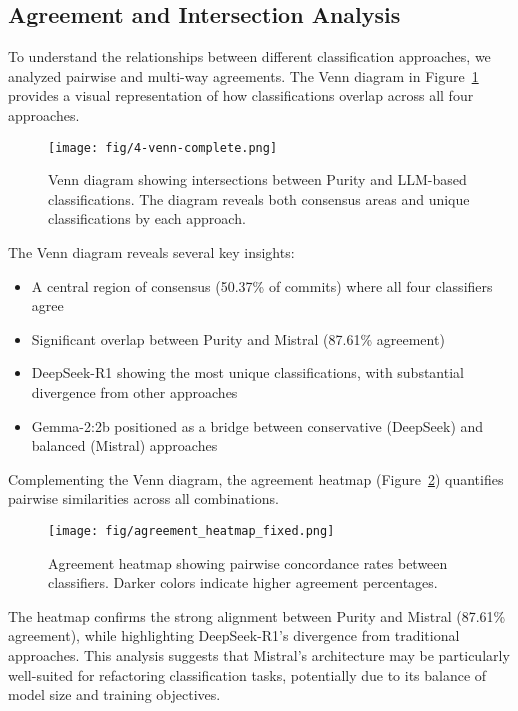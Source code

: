\subsection{Agreement and Intersection Analysis}

To understand the relationships between different classification approaches, we analyzed pairwise and multi-way agreements. The Venn diagram in Figure~\ref{fig:venn} provides a visual representation of how classifications overlap across all four approaches.

\begin{figure}[H]
\centering
\texttt{[image: fig/4-venn-complete.png]}
\caption{Venn diagram showing intersections between Purity and LLM-based classifications. The diagram reveals both consensus areas and unique classifications by each approach.}
\label{fig:venn}
\end{figure}

The Venn diagram reveals several key insights:
\begin{itemize}
    \item A central region of consensus (50.37\% of commits) where all four classifiers agree
    \item Significant overlap between Purity and Mistral (87.61\% agreement)
    \item DeepSeek-R1 showing the most unique classifications, with substantial divergence from other approaches
    \item Gemma-2:2b positioned as a bridge between conservative (DeepSeek) and balanced (Mistral) approaches
\end{itemize}

Complementing the Venn diagram, the agreement heatmap (Figure~\ref{fig:agreement-heatmap}) quantifies pairwise similarities across all combinations.

\begin{figure}[H]
\centering
\texttt{[image: fig/agreement\_heatmap\_fixed.png]}
\caption{Agreement heatmap showing pairwise concordance rates between classifiers. Darker colors indicate higher agreement percentages.}
\label{fig:agreement-heatmap}
\end{figure}

The heatmap confirms the strong alignment between Purity and Mistral (87.61\% agreement), while highlighting DeepSeek-R1's divergence from traditional approaches. This analysis suggests that Mistral's architecture may be particularly well-suited for refactoring classification tasks, potentially due to its balance of model size and training objectives.

